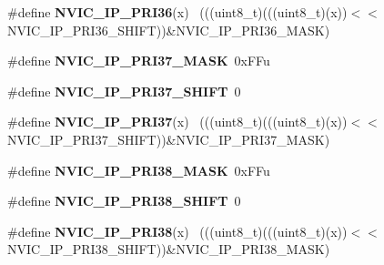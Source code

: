 \begin{DoxyCompactItemize}
\item 
\hypertarget{group___n_v_i_c___register___masks_ga34d31009952c83baf7d637b86517ebd3}{}\#define {\bfseries N\+V\+I\+C\+\_\+\+I\+P\+\_\+\+P\+R\+I36}(x)                                              ~(((uint8\+\_\+t)(((uint8\+\_\+t)(x))$<$$<$N\+V\+I\+C\+\_\+\+I\+P\+\_\+\+P\+R\+I36\+\_\+\+S\+H\+I\+F\+T))\&N\+V\+I\+C\+\_\+\+I\+P\+\_\+\+P\+R\+I36\+\_\+\+M\+A\+S\+K)\label{group___n_v_i_c___register___masks_ga34d31009952c83baf7d637b86517ebd3}

\item 
\hypertarget{group___n_v_i_c___register___masks_ga32b318b49afb7dec684b884c5301083c}{}\#define {\bfseries N\+V\+I\+C\+\_\+\+I\+P\+\_\+\+P\+R\+I37\+\_\+\+M\+A\+S\+K}~0x\+F\+Fu\label{group___n_v_i_c___register___masks_ga32b318b49afb7dec684b884c5301083c}

\item 
\hypertarget{group___n_v_i_c___register___masks_ga63496bb9a0dfa906cc3175a124c4d9c6}{}\#define {\bfseries N\+V\+I\+C\+\_\+\+I\+P\+\_\+\+P\+R\+I37\+\_\+\+S\+H\+I\+F\+T}~0\label{group___n_v_i_c___register___masks_ga63496bb9a0dfa906cc3175a124c4d9c6}

\item 
\hypertarget{group___n_v_i_c___register___masks_ga085dc6f0a679cc6fc7c7810272820794}{}\#define {\bfseries N\+V\+I\+C\+\_\+\+I\+P\+\_\+\+P\+R\+I37}(x)                                              ~(((uint8\+\_\+t)(((uint8\+\_\+t)(x))$<$$<$N\+V\+I\+C\+\_\+\+I\+P\+\_\+\+P\+R\+I37\+\_\+\+S\+H\+I\+F\+T))\&N\+V\+I\+C\+\_\+\+I\+P\+\_\+\+P\+R\+I37\+\_\+\+M\+A\+S\+K)\label{group___n_v_i_c___register___masks_ga085dc6f0a679cc6fc7c7810272820794}

\item 
\hypertarget{group___n_v_i_c___register___masks_ga9883d806214f231565b18dc4786901a5}{}\#define {\bfseries N\+V\+I\+C\+\_\+\+I\+P\+\_\+\+P\+R\+I38\+\_\+\+M\+A\+S\+K}~0x\+F\+Fu\label{group___n_v_i_c___register___masks_ga9883d806214f231565b18dc4786901a5}

\item 
\hypertarget{group___n_v_i_c___register___masks_ga543504ca332b4b01612f4f9ed98830e7}{}\#define {\bfseries N\+V\+I\+C\+\_\+\+I\+P\+\_\+\+P\+R\+I38\+\_\+\+S\+H\+I\+F\+T}~0\label{group___n_v_i_c___register___masks_ga543504ca332b4b01612f4f9ed98830e7}

\item 
\hypertarget{group___n_v_i_c___register___masks_gaa8b654d5f6f474dfd201432d49f024ae}{}\#define {\bfseries N\+V\+I\+C\+\_\+\+I\+P\+\_\+\+P\+R\+I38}(x)                                              ~(((uint8\+\_\+t)(((uint8\+\_\+t)(x))$<$$<$N\+V\+I\+C\+\_\+\+I\+P\+\_\+\+P\+R\+I38\+\_\+\+S\+H\+I\+F\+T))\&N\+V\+I\+C\+\_\+\+I\+P\+\_\+\+P\+R\+I38\+\_\+\+M\+A\+S\+K)\label{group___n_v_i_c___register___masks_gaa8b654d5f6f474dfd201432d49f024ae}


\end{DoxyCompactItemize}
